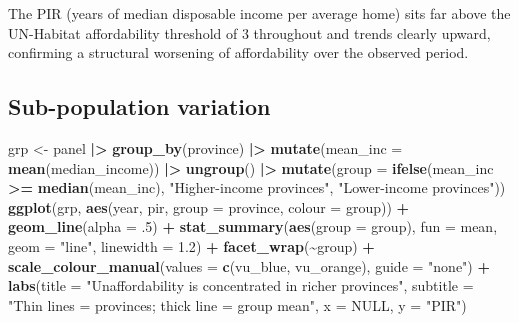 \documentclass[
]{article}
\newenvironment{Shaded}{\begin{snugshade}}{\end{snugshade}}
\newcommand{\AttributeTok}[1]{\textcolor[rgb]{0.13,0.29,0.53}{#1}}
\newcommand{\ConstantTok}[1]{\textcolor[rgb]{0.56,0.35,0.01}{#1}}
\newcommand{\DecValTok}[1]{\textcolor[rgb]{0.00,0.00,0.81}{#1}}
\newcommand{\FloatTok}[1]{\textcolor[rgb]{0.00,0.00,0.81}{#1}}
\newcommand{\FunctionTok}[1]{\textcolor[rgb]{0.13,0.29,0.53}{\textbf{#1}}}
\newcommand{\NormalTok}[1]{#1}
\newcommand{\OtherTok}[1]{\textcolor[rgb]{0.56,0.35,0.01}{#1}}
\newcommand{\SpecialCharTok}[1]{\textcolor[rgb]{0.81,0.36,0.00}{\textbf{#1}}}
\newcommand{\StringTok}[1]{\textcolor[rgb]{0.31,0.60,0.02}{#1}}
\newcounter{none} %
\begin{document}
The PIR (years of median disposable income per average home) sits far
above the UN-Habitat affordability threshold of 3 throughout and trends
clearly upward, confirming a structural worsening of affordability over
the observed period.

\subsection{Sub-population variation}\label{sub-population-variation}

\begin{Shaded}
\begin{Highlighting}[]
\NormalTok{grp }\OtherTok{\textless{}{-}}\NormalTok{ panel }\SpecialCharTok{|\textgreater{}}
  \FunctionTok{group\_by}\NormalTok{(province) }\SpecialCharTok{|\textgreater{}} \FunctionTok{mutate}\NormalTok{(}\AttributeTok{mean\_inc =} \FunctionTok{mean}\NormalTok{(median\_income)) }\SpecialCharTok{|\textgreater{}} \FunctionTok{ungroup}\NormalTok{() }\SpecialCharTok{|\textgreater{}}
  \FunctionTok{mutate}\NormalTok{(}\AttributeTok{group =} \FunctionTok{ifelse}\NormalTok{(mean\_inc }\SpecialCharTok{\textgreater{}=} \FunctionTok{median}\NormalTok{(mean\_inc),}
                        \StringTok{"Higher{-}income provinces"}\NormalTok{, }\StringTok{"Lower{-}income provinces"}\NormalTok{))}
\FunctionTok{ggplot}\NormalTok{(grp, }\FunctionTok{aes}\NormalTok{(year, pir, }\AttributeTok{group =}\NormalTok{ province, }\AttributeTok{colour =}\NormalTok{ group)) }\SpecialCharTok{+}
  \FunctionTok{geom\_line}\NormalTok{(}\AttributeTok{alpha =}\NormalTok{ .}\DecValTok{5}\NormalTok{) }\SpecialCharTok{+}
  \FunctionTok{stat\_summary}\NormalTok{(}\FunctionTok{aes}\NormalTok{(}\AttributeTok{group =}\NormalTok{ group), }\AttributeTok{fun =}\NormalTok{ mean, }\AttributeTok{geom =} \StringTok{"line"}\NormalTok{, }\AttributeTok{linewidth =} \FloatTok{1.2}\NormalTok{) }\SpecialCharTok{+}
  \FunctionTok{facet\_wrap}\NormalTok{(}\SpecialCharTok{\textasciitilde{}}\NormalTok{group) }\SpecialCharTok{+}
  \FunctionTok{scale\_colour\_manual}\NormalTok{(}\AttributeTok{values =} \FunctionTok{c}\NormalTok{(vu\_blue, vu\_orange), }\AttributeTok{guide =} \StringTok{"none"}\NormalTok{) }\SpecialCharTok{+}
  \FunctionTok{labs}\NormalTok{(}\AttributeTok{title =} \StringTok{"Unaffordability is concentrated in richer provinces"}\NormalTok{,}
       \AttributeTok{subtitle =} \StringTok{"Thin lines = provinces; thick line = group mean"}\NormalTok{,}
       \AttributeTok{x =} \ConstantTok{NULL}\NormalTok{, }\AttributeTok{y =} \StringTok{"PIR"}\NormalTok{)}
\end{Highlighting}
\end{Shaded}
\end{document}

